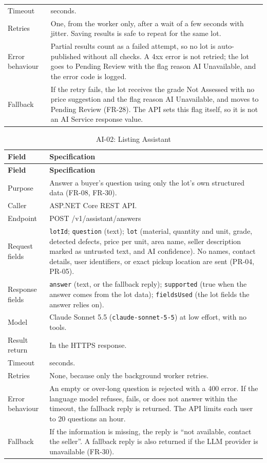 {\begin{longtable}{@{}>{\raggedright\arraybackslash}p{}>{\raggedright\arraybackslash}p{}@{}}
Timeout & 120 seconds. \\
Retries & One, from the worker only, after a wait of a few seconds with jitter. Saving results is safe to repeat for the same lot. \\
Error behaviour & Partial results count as a failed attempt, so no lot is auto-published without all checks. A 4xx error is not retried; the lot goes to Pending Review with the flag reason AI Unavailable, and the error code is logged. \\
Fallback & If the retry fails, the lot receives the grade Not Assessed with no price suggestion and the flag reason AI Unavailable, and moves to Pending Review (FR-28). The API sets this flag itself, so it is not an AI Service response value. \\
\bottomrule
\end{longtable}

\begin{longtable}{@{}>{\raggedright\arraybackslash}p{}>{\raggedright\arraybackslash}p{}@{}}
\caption{AI-02: Listing Assistant}\label{tab:ai-assistant}\\
\toprule
\textbf{Field} & \textbf{Specification} \\
\midrule
\endfirsthead
\toprule
\textbf{Field} & \textbf{Specification} \\
\midrule
\endhead
Purpose & Answer a buyer's question using only the lot's own structured data (FR-08, FR-30). \\
Caller & ASP.NET Core REST API. \\
Endpoint & POST /v1/assistant/answers \\
Request fields & \texttt{lotId}; \texttt{question} (text); \texttt{lot} (material, quantity and unit, grade, detected defects, price per unit, area name, seller description marked as untrusted text, and AI confidence). No names, contact details, user identifiers, or exact pickup location are sent (PR-04, PR-05). \\
Response fields & \texttt{answer} (text, or the fallback reply); \texttt{supported} (true when the answer comes from the lot data); \texttt{fieldsUsed} (the lot fields the answer relies on). \\
Model & Claude Sonnet 5.5 (\texttt{claude-sonnet-5-5}) at low effort, with no tools. \\
Result return & In the HTTPS response. \\
Timeout & 30 seconds. \\
Retries & None, because only the background worker retries. \\
Error behaviour & An empty or over-long question is rejected with a 400 error. If the language model refuses, fails, or does not answer within the timeout, the fallback reply is returned. The API limits each user to 20 questions an hour. \\
Fallback & If the information is missing, the reply is ``not available, contact the seller''. A fallback reply is also returned if the LLM provider is unavailable (FR-30). \\
\bottomrule
\end{longtable}

}
